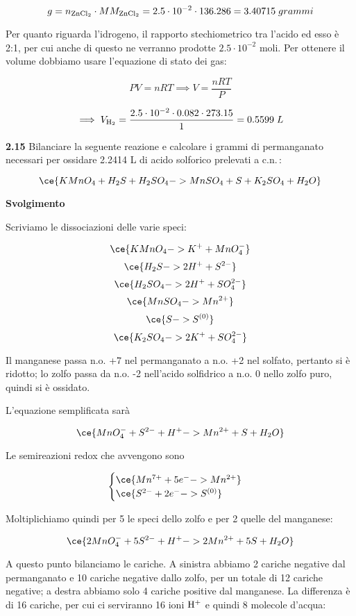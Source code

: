 $$g=n_{\rm ZnCl_2} \cdot MM_{\rm ZnCl_2}=2.5 \cdot 10^{-2} \cdot 136.286=3.40715\;grammi$$

Per quanto riguarda l'idrogeno, il rapporto stechiometrico tra l'acido ed esso è 2:1, per cui anche di questo ne verranno prodotte $2.5 \cdot 10^{-2}$ moli. Per ottenere il volume dobbiamo usare l'equazione di stato dei gas:

$$PV=nRT \implies V=\frac{nRT}{P}$$

$$\implies V_{\rm H_2}
=\frac{2.5 \cdot 10^{-2} \cdot 0.082 \cdot 273.15}{1}
=0.5599\;L$$

\vspace{0.2cm}\textbf{2.15} Bilanciare la seguente reazione e calcolare i grammi di permanganato necessari per ossidare 2.2414 L di acido solforico prelevati a c.n.\,:

$$\ce{KMnO_4 + H_2S + H_2SO_4 -> MnSO_4 + S + K_2SO_4 + H_2O}$$

\vspace{0.2cm}\large\textbf{Svolgimento}\normalsize

\vspace{0.2cm}Scriviamo le dissociazioni delle varie speci:

$$\ce{KMnO_4 -> K^+ + MnO_4^-}$$
$$\ce{H_2S -> 2H^+ + S^{2-}}$$
$$\ce{H_2SO_4 -> 2H^+ + SO_4^{2-}}$$
$$\ce{MnSO_4 -> Mn^{2+}}$$
$$\ce{S -> S^{(0)}}$$
$$\ce{K_2SO_4 -> 2K^+ + SO_4^{2-}}$$

Il manganese passa n.o. +7 nel permanganato a n.o. +2 nel solfato, pertanto si è ridotto; lo zolfo passa da n.o. -2 nell'acido solfidrico a n.o. 0 nello zolfo puro, quindi si è ossidato.

L'equazione semplificata sarà

$$\ce{MnO_4^- + S^{2-} + H^+ -> Mn^{2+} + S + H_2O}$$

Le semireazioni redox che avvengono sono

$$\begin{cases}
    \ce{Mn^{7+} + 5e^- -> Mn^{2+}}\\
    \ce{S^{2-} + 2e^- -> S^{(0)}}
\end{cases}$$

Moltiplichiamo quindi per 5 le speci dello zolfo e per 2 quelle del manganese:

$$\ce{2MnO_4^- + 5S^{2-} + H^+ -> 2Mn^{2+} + 5S + H_2O}$$

A questo punto bilanciamo le cariche. A sinistra abbiamo 2 cariche negative dal permanganato e 10 cariche negative dallo zolfo, per un totale di 12 cariche negative; a destra abbiamo solo 4 cariche positive dal manganese. La differenza è di 16 cariche, per cui ci serviranno 16 ioni $\rm H^+$ e quindi 8 molecole d'acqua:

